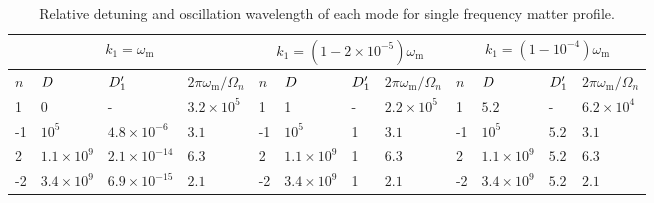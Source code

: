 





\begin{table}
\centering
\small
\setlength\tabcolsep{2pt}
\begin{tabular}{llll|llll|llll}
\hline
 \multicolumn{4}{c|}{$k_1=\omega_{\mathrm m}$} & \multicolumn{4}{c|}{$k_1=(1-2\times 10^{-5})\omega_{\mathrm{m}}$} & \multicolumn{4}{c}{$k_1=(1-10^{-4})\omega_{\mathrm m}$} \\
\hline
   $n$ & $D$ & $D'_1$  & $2\pi\omega_{\mathrm m}/\Omega_n$ & $n$ & $D$ & $D'_1$ & $2\pi\omega_{\mathrm m}/\Omega_n$ & $n$ & $D$ & $D'_1$ & $2\pi\omega_{\mathrm m}/\Omega_n$  \\
\hline
 1 &	0  & - &   $3.2\times10^5$   & 1 &	1 &  -  &   $2.2\times 10^5$       & 1   &	$5.2$ &  - & $6.2\times10^4$   \\
-1 &	$10^5$ &  $4.8\times 10^{-6}$  &   $3.1$     &     -1 &	$10^5$ &   1  &   $3.1$               &  -1 &	$10^5$  & $5.2$ & $3.1$  \\
2 &	$1.1\times 10^9$  &   $2.1\times 10^{-14}$  &   $6.3$    &  2 & 	$1.1\times 10^9$ &  1  &    $6.3$   &  2  &	$1.1\times 10^9$  &  $5.2$  & $6.3$  \\
-2 &	$3.4\times 10^9$  & $6.9\times 10^{-15}$ & $2.1$ &    -2 &	$3.4\times10^9$ &  1  &  $2.1$          & -2  &	$3.4\times 10^9$ & $5.2$ &  $2.1$  \\
\hline
\end{tabular}
\caption{\label{tab-q-values-single-frequency-example}Relative detuning and oscillation wavelength of each mode for single frequency matter profile.}
\end{table}


